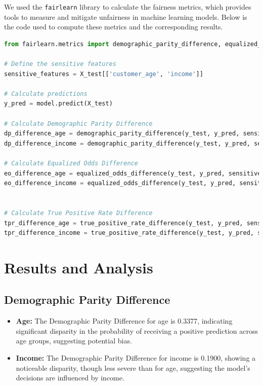 \documentclass[12pt,a4paper]{report}
\begin{document}
We used the \texttt{fairlearn} library to calculate the fairness metrics, which provides tools to measure and mitigate unfairness in machine learning models. Below is the code used to compute these metrics and the corresponding results.\\

\begin{lstlisting}[language=Python, caption={Calculating Fairness Metrics}]
from fairlearn.metrics import demographic_parity_difference, equalized_odds_difference, true_positive_rate_difference

# Define the sensitive features
sensitive_features = X_test[['customer_age', 'income']]

# Calculate predictions
y_pred = model.predict(X_test)

# Calculate Demographic Parity Difference
dp_difference_age = demographic_parity_difference(y_test, y_pred, sensitive_features=X_test['customer_age'])
dp_difference_income = demographic_parity_difference(y_test, y_pred, sensitive_features=X_test['income'])

# Calculate Equalized Odds Difference
eo_difference_age = equalized_odds_difference(y_test, y_pred, sensitive_features=X_test['customer_age'])
eo_difference_income = equalized_odds_difference(y_test, y_pred, sensitive_features=X_test['income'])


# Calculate True Positive Rate Difference
tpr_difference_age = true_positive_rate_difference(y_test, y_pred, sensitive_features=X_test['customer_age'])
tpr_difference_income = true_positive_rate_difference(y_test, y_pred, sensitive_features=X_test['income'])

\end{lstlisting}

\section{Results and Analysis}

\subsection{Demographic Parity Difference}

\begin{itemize}
    \item \textbf{Age:} The Demographic Parity Difference for age is 0.3377, indicating significant disparity in the probability of receiving a positive prediction across age groups, suggesting potential bias.
    
    \item \textbf{Income:} The Demographic Parity Difference for income is 0.1900, showing a noticeable disparity, though less severe than for age, suggesting the model's decisions are influenced by income.
\end{itemize}
\end{document}
